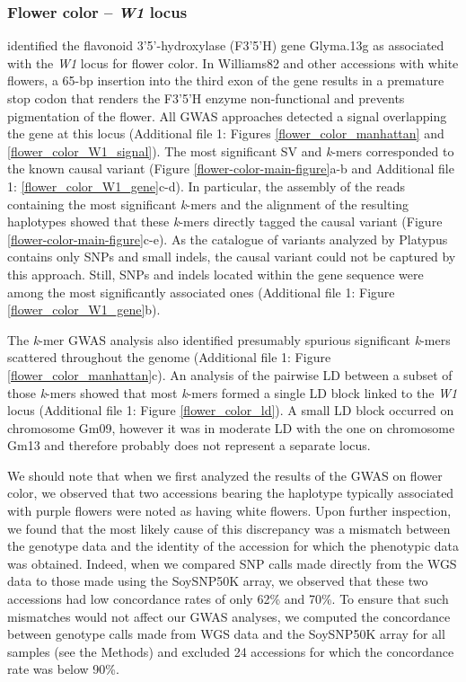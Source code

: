 \subsubsection*{Flower color -- \textit{W1} locus}
\label{sv-gwas-main-results-flower-color-l1}

\cite{zabala2007} identified the flavonoid 3’5’-hydroxylase (F3’5’H) gene
Glyma.13g as associated with the \textit{W1} locus for flower color. In
Williams82 and other accessions with white flowers, a 65-bp insertion into the
third exon of the gene results in a premature stop codon that renders the
F3’5’H enzyme non-functional and prevents pigmentation of the flower. All
GWAS approaches detected a signal overlapping the gene at this locus (Additional file 1: Figures
\ref{flower_color_manhattan} and \ref{flower_color_W1_signal}). The most
significant SV and \textit{k}-mers corresponded to the known causal variant
(Figure \ref{flower-color-main-figure}a-b and Additional file 1: \ref{flower_color_W1_gene}c-d).
In particular, the assembly of the reads containing the most significant \textit{k}-mers
and the alignment of the resulting haplotypes showed that these \textit{k}-mers
directly tagged the causal variant (Figure \ref{flower-color-main-figure}c-e).
As the catalogue of variants analyzed by Platypus contains only SNPs and small
indels, the causal variant could not be captured by this approach. Still, SNPs
and indels located within the gene sequence were among the most significantly
associated ones (Additional file 1: Figure \ref{flower_color_W1_gene}b).

The \textit{k}-mer GWAS analysis also identified presumably spurious significant
\textit{k}-mers scattered throughout the genome (Additional file 1: Figure
\ref{flower_color_manhattan}c). An analysis of the pairwise LD between a subset
of those \textit{k}-mers showed that most \textit{k}-mers formed a single LD block
linked to the \textit{W1} locus (Additional file 1: Figure \ref{flower_color_ld}). A small LD block
occurred on chromosome Gm09, however it was in moderate LD with the one on chromosome
Gm13 and therefore probably does not represent a separate locus.

We should note that when we first analyzed the results of the GWAS on flower
color, we observed that two accessions bearing the haplotype typically
associated with purple flowers were noted as having white flowers. Upon further
inspection, we found that the most likely cause of this discrepancy was a
mismatch between the genotype data and the identity of the accession for which
the phenotypic data was obtained. Indeed, when we compared SNP calls made
directly from the WGS data to those made using the SoySNP50K array, we observed
that these two accessions had low concordance rates of only 62\% and 70\%. To
ensure that such mismatches would not affect our GWAS analyses, we computed the
concordance between genotype calls made from WGS data and the SoySNP50K array
for all samples (see the Methods) and excluded 24 accessions for which the
concordance rate was below 90\%.


